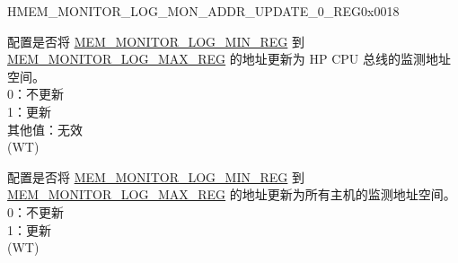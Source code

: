 \begin{register}{H}{MEM\_MONITOR\_LOG\_MON\_ADDR\_UPDATE\_0\_REG}{0x0018}\label{regdesc:MEMMONITORLOGMONADDRUPDATE0REG}
%
%
%
\regnewline%
\begin{regdesc}\begin{reglist}
\label{fielddesc:MEMMONITORLOGMONADDRCOREUPDATE}\item [MEM\_MONITOR\_LOG\_MON\_ADDR\_CORE\_UPDATE] 配置是否将 \hyperref[regdesc:MEMMONITORLOGMINREG]{MEM\_MONITOR\_LOG\_MIN\_REG} 到 \hyperref[regdesc:MEMMONITORLOGMAXREG]{MEM\_MONITOR\_LOG\_MAX\_REG} 的地址更新为 HP CPU 总线的监测地址空间。
\\
0：不更新\\
1：更新\\
其他值：无效\\
(WT)
\label{fielddesc:MEMMONITORLOGMONADDRALLUPDATE}\item [MEM\_MONITOR\_LOG\_MON\_ADDR\_ALL\_UPDATE] 配置是否将 \hyperref[regdesc:MEMMONITORLOGMINREG]{MEM\_MONITOR\_LOG\_MIN\_REG} 到 \hyperref[regdesc:MEMMONITORLOGMAXREG]{MEM\_MONITOR\_LOG\_MAX\_REG} 的地址更新为所有主机的监测地址空间。\\
0：不更新\\
1：更新\\
(WT)
\end{reglist}\end{regdesc}
\end{register}


